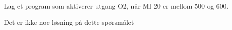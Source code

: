 

Lag et program som aktiverer utgang O2, n{\aa}r MI 20 er mellom 500 og 600. 








Det er ikke noe l{\o}sning p{\aa} dette sp{\o}rsm{\aa}let














